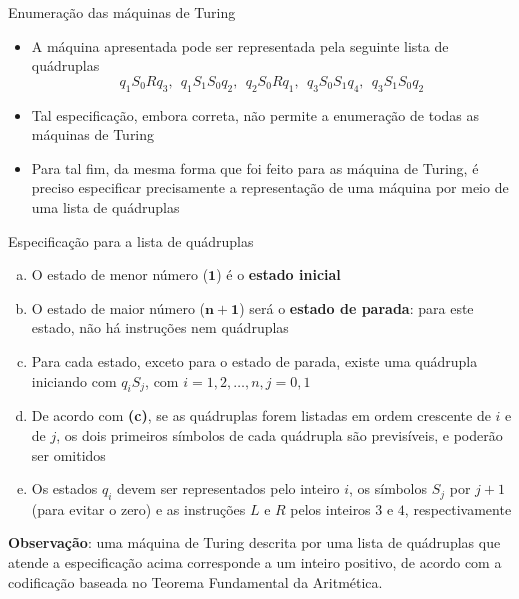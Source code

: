 \begin{frame}[fragile]{Enumeração das máquinas de Turing}

    \begin{itemize}
        \item A máquina apresentada pode ser representada pela seguinte lista de quádruplas
        \[
            q_1S_0Rq_3, \ \ q_1S_1S_0q_2, \ \ q_2S_0Rq_1, \ \ q_3S_0S_1q_4, \ \ q_3S_1S_0q_2
        \]

        \item Tal especificação, embora correta, não permite a enumeração de todas as máquinas
            de Turing

        \item Para tal fim, da mesma forma que foi feito para as máquina de Turing, é preciso
            especificar precisamente a representação de uma máquina por meio de uma lista
            de quádruplas
    \end{itemize}

\end{frame}

\begin{frame}[fragile]{Especificação para a lista de quádruplas}

    \begin{enumerate}[(a)]
        \item O estado de menor número ($\mathbf{1}$) é o \textbf{estado inicial}

        \item O estado de maior número ($\mathbf{n + 1}$) será o \textbf{estado de parada}: para 
            este estado, não há instruções nem quádruplas

        \item Para cada estado, exceto para o estado de parada, existe uma quádrupla iniciando
            com $q_iS_j$, com $i = 1, 2, \ldots, n, j = 0, 1$

        \item De acordo com \textbf{(c)}, se as quádruplas forem listadas em ordem crescente de
            $i$ e de $j$, os dois primeiros símbolos de cada quádrupla são previsíveis, e poderão
            ser omitidos

        \item Os estados $q_i$ devem ser representados pelo inteiro $i$, os símbolos $S_j$ por
            $j + 1$ (para evitar o zero) e as instruções $L$ e $R$ pelos inteiros $3$ e $4$,
            respectivamente
    \end{enumerate}

    \textbf{Observação}: uma máquina de Turing descrita por uma lista de quádruplas que atende a
        especificação acima corresponde a um inteiro positivo, de acordo com a codificação baseada
        no Teorema Fundamental da Aritmética.
\end{frame}

